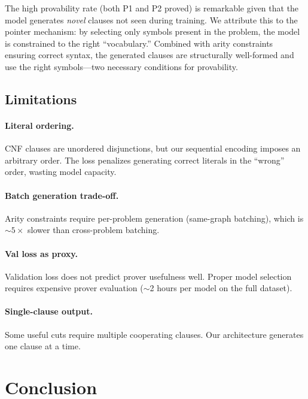 \documentclass{article}
\begin{document}
The high provability rate (both P1 and P2 proved) is remarkable given that the
model generates \emph{novel} clauses not seen during training. We attribute this
to the pointer mechanism: by selecting only symbols present in the problem, the
model is constrained to the right ``vocabulary.'' Combined with arity constraints
ensuring correct syntax, the generated clauses are structurally well-formed and
use the right symbols---two necessary conditions for provability.

\subsection{Limitations}

\paragraph{Literal ordering.} CNF clauses are unordered disjunctions, but our
sequential encoding imposes an arbitrary order. The loss penalizes generating
correct literals in the ``wrong'' order, wasting model capacity.

\paragraph{Batch generation trade-off.} Arity constraints require per-problem
generation (same-graph batching), which is ${\sim}5\times$ slower than
cross-problem batching.

\paragraph{Val loss as proxy.} Validation loss does not predict prover usefulness
well. Proper model selection requires expensive prover evaluation (${\sim}$2 hours
per model on the full dataset).

\paragraph{Single-clause output.} Some useful cuts require multiple cooperating
clauses. Our architecture generates one clause at a time.

\section{Conclusion}
\label{sec:conclusion}
\end{document}
